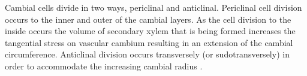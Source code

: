 Cambial cells divide in two ways, periclinal and anticlinal. Periclinal cell
division occurs to the inner and outer of the cambial layers. As the cell
division to the inside occurs the volume of secondary xylem that is being formed
increases the tangential stress on vascular cambium resulting in an extension of
the cambial circumference. Anticlinal division occurs transversely (or sudotransversely)  in order to accommodate the increasing cambial radius \cite{fromm2013cellular}.
